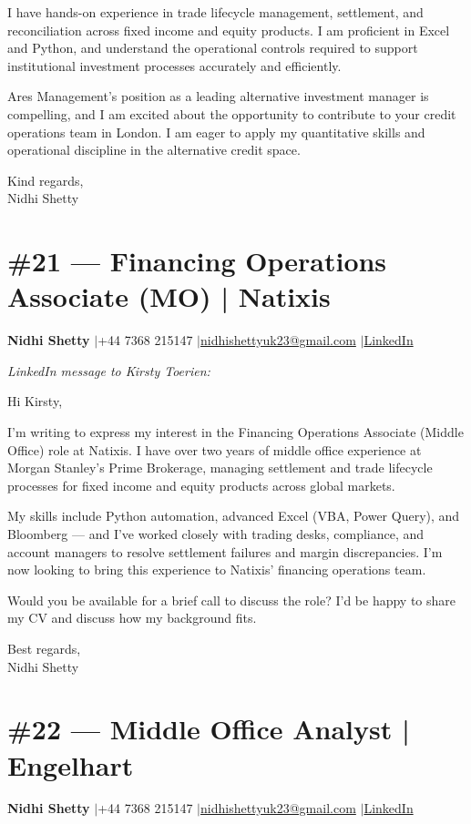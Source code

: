 \documentclass[11pt,a4paper]{article}
\makeatletter
\newcommand{\coverheader}{%
\begin{flushleft}
{\bfseries Nidhi Shetty} \enspace$\vert$\enspace +44 7368 215147 \enspace$\vert$\enspace \href{mailto:nidhishettyuk23@gmail.com}{nidhishettyuk23@gmail.com} \enspace$\vert$\enspace \href{https://www.linkedin.com/in/nidhi-shetty23-1841b7181}{LinkedIn}
\end{flushleft}
\vspace{4pt}
}
\makeatother
\begin{document}
I have hands-on experience in trade lifecycle management, settlement, and reconciliation across fixed income and equity products. I am proficient in Excel and Python, and understand the operational controls required to support institutional investment processes accurately and efficiently.

Ares Management's position as a leading alternative investment manager is compelling, and I am excited about the opportunity to contribute to your credit operations team in London. I am eager to apply my quantitative skills and operational discipline in the alternative credit space.

\vspace{8pt}
Kind regards,\\
Nidhi Shetty

\newpage
\section{\#21 --- Financing Operations Associate (MO) | Natixis}
\coverheader

\textit{LinkedIn message to Kirsty Toerien:}

\vspace{6pt}

Hi Kirsty,

I'm writing to express my interest in the Financing Operations Associate (Middle Office) role at Natixis. I have over two years of middle office experience at Morgan Stanley's Prime Brokerage, managing settlement and trade lifecycle processes for fixed income and equity products across global markets.

My skills include Python automation, advanced Excel (VBA, Power Query), and Bloomberg --- and I've worked closely with trading desks, compliance, and account managers to resolve settlement failures and margin discrepancies. I'm now looking to bring this experience to Natixis' financing operations team.

Would you be available for a brief call to discuss the role? I'd be happy to share my CV and discuss how my background fits.

\vspace{8pt}
Best regards,\\
Nidhi Shetty

\newpage
\section{\#22 --- Middle Office Analyst | Engelhart}
\coverheader
\end{document}
